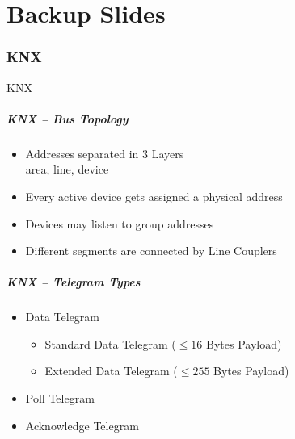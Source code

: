 \part{Backup Slides}
\label{part:backup}

\section{KNX}
\begin{frame}[c]
	\centering
	\LARGE KNX
\end{frame}

\begin{frame}[c]
	\frametitle{KNX -- Bus Topology}
	\begin{itemize}
		\item Addresses separated in 3 Layers\\area, line, device
		\item Every active device gets assigned a physical address
		\item Devices may listen to group addresses
		\item Different segments are connected by Line Couplers
	\end{itemize}
\end{frame}

\begin{frame}[c]
\frametitle{KNX -- Telegram Types}
	\begin{itemize}
		\item Data Telegram
		\begin{itemize}
			\item Standard Data Telegram ($\leq 16$ Bytes Payload)
			\item Extended Data Telegram ($\leq 255$ Bytes Payload)
		\end{itemize}
		\item Poll Telegram
		\item Acknowledge Telegram
	\end{itemize}
	
	\note{
		
	}
\end{frame}

